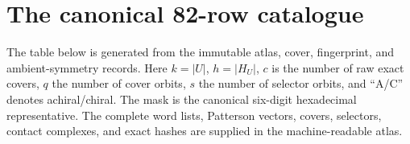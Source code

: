 \section{The canonical 82-row catalogue}\label{app:catalogue}

The table below is generated from the immutable atlas, cover, fingerprint,
and ambient-symmetry records.  Here $k=|U|$, $h=|H_U|$, $c$ is the number of
raw exact covers, $q$ the number of cover orbits, $s$ the number of selector
orbits, and ``A/C'' denotes achiral/chiral.  The mask is the canonical
six-digit hexadecimal representative.  The complete word lists, Patterson
vectors, covers, selectors, contact complexes, and exact hashes are supplied
in the machine-readable atlas.



